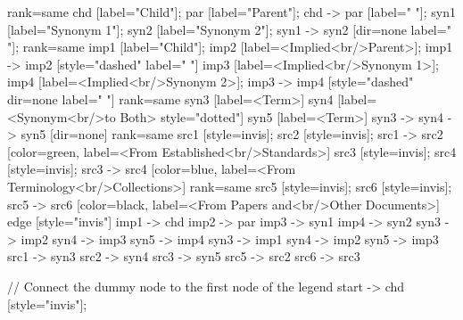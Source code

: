 \documentclass{article}
\begin{document}
{{    {
        rank=same
        chd [label="Child"];
        par [label="Parent"];
        chd -> par [label="                "];
        syn1 [label="Synonym 1"];
        syn2 [label="Synonym 2"];
        syn1 -> syn2 [dir=none label="                "];
    }
    {
        rank=same
        imp1 [label="Child"];
        imp2 [label=<Implied<br/>Parent>];
        imp1 -> imp2 [style="dashed" label="                "]
        imp3 [label=<Implied<br/>Synonym 1>];
        imp4 [label=<Implied<br/>Synonym 2>];
        imp3 -> imp4 [style="dashed" dir=none label="                "]
    }
    {
        rank=same
        syn3 [label=<Term>]
        syn4 [label=<Synonym<br/>to Both> style="dotted"]
        syn5 [label=<Term>]
        syn3 -> syn4 -> syn5 [dir=none]
    }
{
rank=same
src1 [style=invis];
src2 [style=invis];
src1 -> src2 [color=green, label=<From Established<br/>Standards>]
src3 [style=invis];
src4 [style=invis];
src3 -> src4 [color=blue, label=<From Terminology<br/>Collections>]
}
{
rank=same
src5 [style=invis];
src6 [style=invis];
src5 -> src6 [color=black, label=<From Papers and<br/>Other Documents>]
}
edge [style="invis"]
imp1 -> chd
imp2 -> par
imp3 -> syn1
imp4 -> syn2
syn3 -> imp2
syn4 -> imp3
syn5 -> imp4
syn3 -> imp1
syn4 -> imp2
syn5 -> imp3
src1 -> syn3
src2 -> syn4
src3 -> syn5
src5 -> src2
src6 -> src3
}

// Connect the dummy node to the first node of the legend
start -> chd [style="invis"];
}
\end{document}
